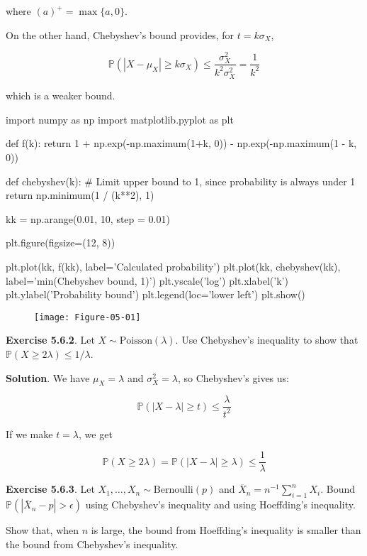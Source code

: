 where \((a)^+ = \max \{ a, 0 \}\).

On the other hand, Chebyshev's bound provides, for \(t = k\sigma_X\),

\[ \mathbb{P}(|X - \mu_X| \geq k \sigma_X) \leq \frac{\sigma_X^2}{k^2 \sigma_X^2}  = \frac{1}{k^2} \]

which is a weaker bound.

\begin{python}
import numpy as np
import matplotlib.pyplot as plt

def f(k):
    return 1 + np.exp(-np.maximum(1+k, 0)) - np.exp(-np.maximum(1 - k, 0))

def chebyshev(k):
    # Limit upper bound to 1, since probability is always under 1
    return np.minimum(1 / (k**2), 1)

kk = np.arange(0.01, 10, step = 0.01)

plt.figure(figsize=(12, 8))

plt.plot(kk, f(kk), label='Calculated probability')
plt.plot(kk, chebyshev(kk), label='min(Chebyshev bound, 1)')
plt.yscale('log')
plt.xlabel('k')
plt.ylabel('Probability bound')
plt.legend(loc='lower left')
plt.show()
\end{python}

\begin{figure}[H]
\texttt{[image: Figure-05-01]}
\end{figure}

\textbf{Exercise 5.6.2}. Let \(X \sim \text{Poisson}(\lambda)\). Use
Chebyshev's inequality to show that
\(\mathbb{P}(X \geq 2\lambda) \leq 1 / \lambda\).

\textbf{Solution}. We have \(\mu_X = \lambda\) and
\(\sigma_X^2 = \lambda\), so Chebyshev's gives us:

\[ \mathbb{P}(|X - \lambda| \geq t) \leq \frac{\lambda}{t^2} \]

If we make \(t = \lambda\), we get

\[ \mathbb{P}(X \geq 2\lambda) = \mathbb{P}(|X - \lambda| \geq \lambda) \leq \frac{1}{\lambda} \]

\textbf{Exercise 5.6.3}. Let
\(X_1, \dots, X_n \sim \text{Bernoulli}(p)\) and
\(\overline{X}_n = n^{-1} \sum_{i=1}^n X_i\). Bound
\(\mathbb{P}(|\overline{X}_n - p| > \epsilon)\) using Chebyshev's
inequality and using Hoeffding's inequality.

Show that, when \(n\) is large, the bound from Hoeffding's inequality is
smaller than the bound from Chebyshev's inequality.

